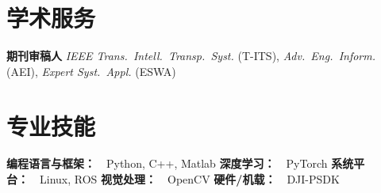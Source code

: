 \documentclass[11pt,a4paper]{ctexart}
\begin{document}
\section{学术服务}

\noindent\textbf{期刊审稿人}\quad
\textit{IEEE Trans.\ Intell.\ Transp.\ Syst.} (T-ITS),
\textit{Adv.\ Eng.\ Inform.} (AEI),
\textit{Expert Syst.\ Appl.} (ESWA)

\section{专业技能}

\noindent
\textbf{编程语言与框架：}\ \ Python, C++, Matlab
\quad
\textbf{深度学习：}\ \ PyTorch
\quad
\textbf{系统平台：}\ \ Linux, ROS
\quad
\textbf{视觉处理：}\ \ OpenCV
\quad
\textbf{硬件/机载：}\ \ DJI-PSDK
\end{document}
